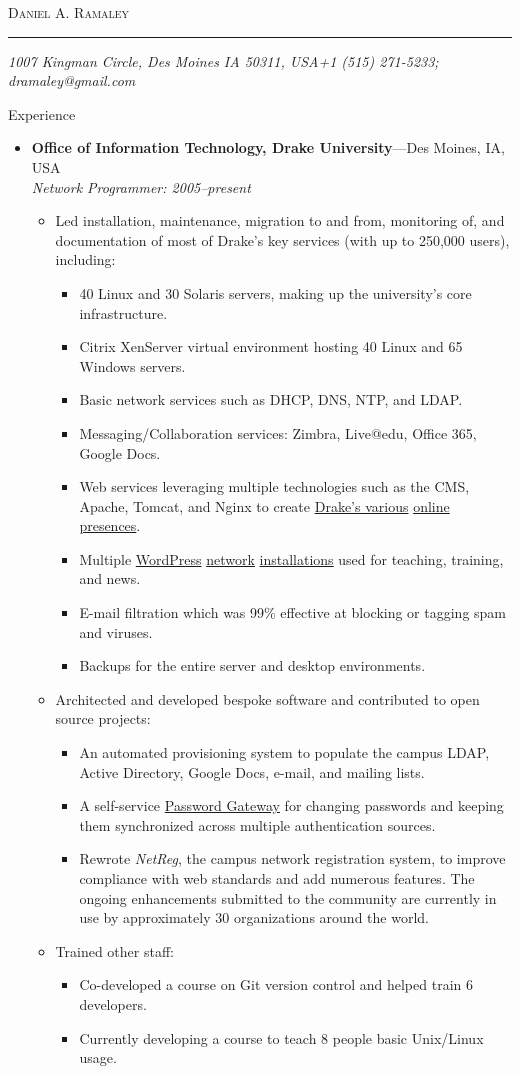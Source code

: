 \documentclass[11pt,oneside,a4paper]{article}
\makeatletter
\newcommand{\name}{Daniel A. Ramaley}
\newcommand{\addr}{1007 Kingman Circle, Des Moines IA 50311, USA}
\newcommand{\phone}{+1 (515) 271-5233}
\newcommand{\email}{dramaley@gmail.com}
\newcommand{\bigname}[1]{
	\begin{center}%
	\huge %
	\scshape#1\end{center}
}
\newenvironment{ressection}[1]{
	\vspace{4pt}
	{\large#1} %
	\begin{itemize}
	\vspace{3pt}
}{
	\end{itemize}
}
\newcommand{\ressubitem}[1]{
	\vspace{-1pt} %
	\item \begin{flushleft} #1 \end{flushleft}
}
\newcommand{\resbigitem}[3]{
	\vspace{-5pt}
	\item
	\textbf{#1}---#2 \\
	\textit{#3}
}
\newenvironment{ressubsec}[3]{
	\resbigitem{#1}{#2}{#3}
	\vspace{-2pt}
	\begin{itemize}
}{
	\end{itemize}
}
\makeatother
\begin{document}
 \selectfont

\bigname{\name}

\vspace{-8pt} \rule{\textwidth}{1pt}

\vspace{-1pt} {\small\itshape \addr \hfill \phone; \email}

\vspace{8 pt}




\begin{ressection}{Experience}

	\begin{ressubsec}{Office of Information Technology, Drake University}{Des Moines, IA, USA}{Network Programmer: 2005--present}
		\ressubitem{Led installation, maintenance, migration to and from, monitoring of, and documentation of most of Drake's key services (with up to 250,000 users), including:
			\begin{itemize}
			\ressubitem{40 Linux and 30 Solaris servers, making up the university's core infrastructure.}
			\ressubitem{Citrix XenServer virtual environment hosting 40 Linux and 65 Windows servers.}
			\ressubitem{Basic network services such as DHCP, DNS, NTP, and LDAP.}
			\ressubitem{Messaging/Collaboration services: Zimbra, Live@edu, Office 365, Google Docs.}
			\ressubitem{Web services leveraging multiple technologies such as the CMS, Apache, Tomcat, and Nginx to create \href{http://www.drake.edu/}{Drake's various} \href{http://news.drake.edu/}{online} \href{http://distinctly.drake.edu/}{presences}.}
			\ressubitem{Multiple \href{http://wlconline.drake.edu/}{WordPress} \href{http://wordpress.drake.edu/}{network} \href{http://oit.drake.edu/}{installations} used for teaching, training, and news.}
			\ressubitem{E-mail filtration which was 99\% effective at blocking or tagging spam and viruses.}
			\ressubitem{Backups for the entire server and desktop environments.}
			\end{itemize}
		}
		\ressubitem{Architected and developed bespoke software and contributed to open source projects:
			\begin{itemize}
			\ressubitem{An automated provisioning system to populate the campus LDAP, Active Directory, Google Docs, e-mail, and mailing lists.}
			\ressubitem{A self-service \href{https://pwgw.drake.edu/}{Password Gateway} for changing passwords and keeping them synchronized across multiple authentication sources.}
			\ressubitem{Rewrote \emph{NetReg}, the campus network registration system, to improve compliance with web standards and add numerous features. The ongoing enhancements submitted to the community are currently in use by approximately 30 organizations around the world.}
			\end{itemize}
		}
		\ressubitem{Trained other staff:
			\begin{itemize}
			\ressubitem{Co-developed a course on Git version control and helped train 6 developers.}
			\ressubitem{Currently developing a course to teach 8 people basic Unix/Linux usage.}
			\end{itemize}
		}
	\end{ressubsec}


\end{ressection}
\end{document}
